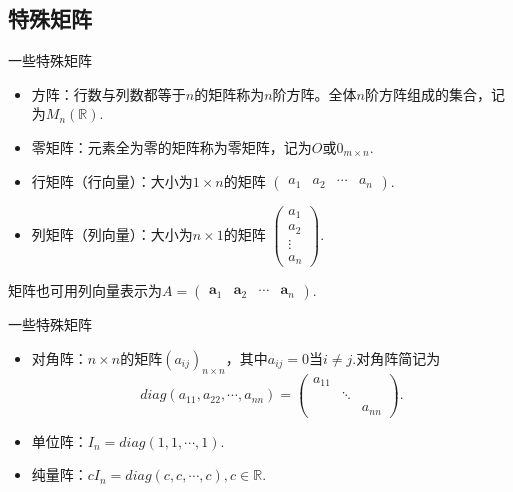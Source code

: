 
\subsection{特殊矩阵}


\begin{frame}{一些特殊矩阵}

\begin{itemize}
\item 方阵：行数与列数都等于$n$的矩阵称为$n$阶方阵。全体$n$阶方阵组成的集合，记为$M_n(\mathbb{R})$.
\item 零矩阵：元素全为零的矩阵称为零矩阵，记为$O$或$0_{m\times n}$.
\item 行矩阵（行向量）：大小为$1\times n$的矩阵 \(\displaystyle \begin{pmatrix} a_1 & a_2 & \cdots & a_n \end{pmatrix}\).
\item 列矩阵（列向量）：大小为$n\times 1$的矩阵 \(\displaystyle \begin{pmatrix} a_1 \\ a_2 \\ \vdots \\ a_n \end{pmatrix}\).
\end{itemize}
矩阵也可用列向量表示为$A = \begin{pmatrix}
\mathbf{a}_1 & \mathbf{a}_2 & \cdots & \mathbf{a}_n
\end{pmatrix}$.

\end{frame}


\begin{frame}{一些特殊矩阵}

\begin{itemize}
\item 对角阵：$n\times n$的矩阵$(a_{ij})_{n\times n}$，其中$a_{ij} = 0 \text{当$i\neq j$.}$对角阵简记为
\[diag(a_{11},a_{22},\cdots,a_{nn}) = \begin{pmatrix} a_{11} & & \\ & \ddots & \\ & & a_{nn} \end{pmatrix}.\]
\item 单位阵：$I_n = diag(1,1,\cdots,1)$.
\item 纯量阵：$cI_n = diag(c,c,\cdots,c), c \in \mathbb{R}$.
\end{itemize}

\end{frame}

